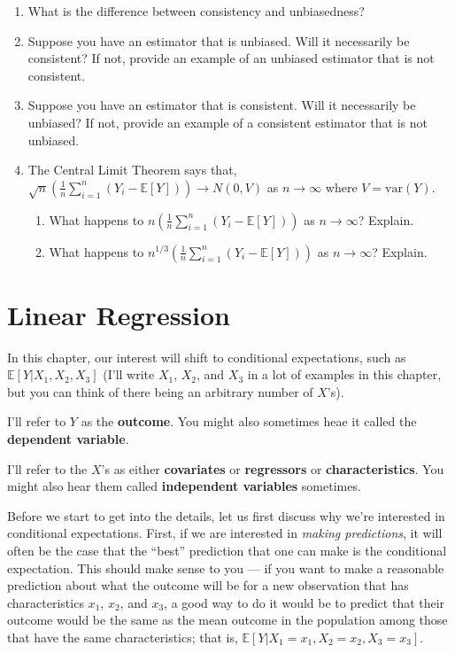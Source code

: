 \documentclass[
  letterpaper,
  DIV=11,
  numbers=noendperiod]{scrreprt}
\begin{document}
\begin{enumerate}
\def\labelenumi{\arabic{enumi}.}
\item
  What is the difference between consistency and unbiasedness?
\item
  Suppose you have an estimator that is unbiased. Will it necessarily be
  consistent? If not, provide an example of an unbiased estimator that
  is not consistent.
\item
  Suppose you have an estimator that is consistent. Will it necessarily
  be unbiased? If not, provide an example of a consistent estimator that
  is not unbiased.
\item
  The Central Limit Theorem says that,
  \(\sqrt{n}\left(\frac{1}{n} \sum_{i=1}^n (Y_i - \mathbb{E}[Y])\right) \rightarrow N(0,V)\)
  as \(n \rightarrow \infty\) where \(V = \mathrm{var}(Y)\).

  \begin{enumerate}
  \def\labelenumii{\alph{enumii})}
  \item
    What happens to
    \(n \left(\frac{1}{n} \sum_{i=1}^n (Y_i - \mathbb{E}[Y])\right)\) as
    \(n \rightarrow \infty\)? Explain.
  \item
    What happens to
    \(n^{1/3} \left(\frac{1}{n} \sum_{i=1}^n (Y_i - \mathbb{E}[Y])\right)\)
    as \(n \rightarrow \infty\)? Explain.
  \end{enumerate}
\end{enumerate}


\chapter{Linear Regression}\label{linear-regression}

In this chapter, our interest will shift to conditional expectations,
such as \(\mathbb{E}[Y|X_1,X_2,X_3]\) (I'll write \(X_1\), \(X_2\), and
\(X_3\) in a lot of examples in this chapter, but you can think of there
being an arbitrary number of \(X\)'s).

I'll refer to \(Y\) as the \textbf{outcome}. You might also sometimes
heae it called the \textbf{dependent variable}.

I'll refer to the \(X\)'s as either \textbf{covariates} or
\textbf{regressors} or \textbf{characteristics}. You might also hear
them called \textbf{independent variables} sometimes.

Before we start to get into the details, let us first discuss why we're
interested in conditional expectations. First, if we are interested in
\emph{making predictions}, it will often be the case that the ``best''
prediction that one can make is the conditional expectation. This should
make sense to you --- if you want to make a reasonable prediction about
what the outcome will be for a new observation that has characteristics
\(x_1\), \(x_2\), and \(x_3\), a good way to do it would be to predict
that their outcome would be the same as the mean outcome in the
population among those that have the same characteristics; that is,
\(\mathbb{E}[Y|X_1=x_1, X_2=x_2, X_3=x_3]\).
\end{document}
